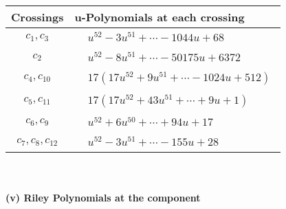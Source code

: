 \documentclass[1p]{elsarticle_modified}
\theoremstyle{definition}
\begin{document}
\begin{tabular}{m{50pt}|m{274pt}}
Crossings & \hspace{64pt}u-Polynomials at each crossing \\
\hline $$\begin{aligned}c_{1},c_{3}\end{aligned}$$&$\begin{aligned}
&u^{52}-3 u^{51}+\cdots-1044 u+68
\end{aligned}$\\
\hline $$\begin{aligned}c_{2}\end{aligned}$$&$\begin{aligned}
&u^{52}-8 u^{51}+\cdots-50175 u+6372
\end{aligned}$\\
\hline $$\begin{aligned}c_{4},c_{10}\end{aligned}$$&$\begin{aligned}
&17(17 u^{52}+9 u^{51}+\cdots-1024 u+512)
\end{aligned}$\\
\hline $$\begin{aligned}c_{5},c_{11}\end{aligned}$$&$\begin{aligned}
&17(17 u^{52}+43 u^{51}+\cdots+9 u+1)
\end{aligned}$\\
\hline $$\begin{aligned}c_{6},c_{9}\end{aligned}$$&$\begin{aligned}
&u^{52}+6 u^{50}+\cdots+94 u+17
\end{aligned}$\\
\hline $$\begin{aligned}c_{7},c_{8},c_{12}\end{aligned}$$&$\begin{aligned}
&u^{52}-3 u^{51}+\cdots-155 u+28
\end{aligned}$\\
\hline
\end{tabular}\\~\\
\newpage\renewcommand{\arraystretch}{1}
\flushleft \textbf{(v) Riley Polynomials at the component}\newline \\
\end{document}
